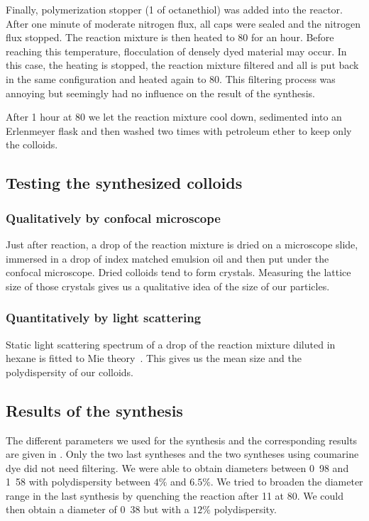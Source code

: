 Finally, polymerization stopper (\unit{1}{\milli\litre} of octanethiol) was added into the reactor. After one minute of moderate nitrogen flux, all caps were sealed and the nitrogen flux stopped. The reaction mixture is then heated to \unit{80}{\celsius} for an hour. Before reaching this temperature, flocculation of densely dyed material may occur. In this case, the heating is stopped, the reaction mixture filtered and all is put back in the same configuration and heated again to \unit{80}{\celsius}. This filtering process was annoying but seemingly had no influence on the result of the synthesis.

After 1 hour at \unit{80}{\celsius} we let the reaction mixture cool down, sedimented into an Erlenmeyer flask and then washed two times with petroleum ether to keep only the colloids.


\subsection{Testing the synthesized colloids}


\subsubsection{Qualitatively by confocal microscope}

Just after reaction, a drop of the reaction mixture is dried on a microscope slide, immersed in a drop of index matched emulsion oil and then put under the confocal microscope. Dried colloids tend to form crystals. Measuring the lattice size of those crystals gives us a qualitative idea of the size of our particles.


\subsubsection{Quantitatively by light scattering}

Static light scattering spectrum of a drop of the reaction mixture diluted in hexane is fitted to Mie theory~\citep{Bohren1983, Dhont1996}. This gives us the mean size and the polydispersity of our colloids.


\subsection{Results of the synthesis}

The different parameters we used for the synthesis and the corresponding results are given in . Only the two last syntheses and the two syntheses using coumarine dye did not need filtering. We were able to obtain diameters between \unit{0.98}{\micro\meter} and \unit{1.58}{\micro\meter} with polydispersity between $4\%$ and $6.5\%$. We tried to broaden the diameter range in the last synthesis by quenching the reaction after \unit{11}{\minute} at \unit{80}{\celsius}. We could then obtain a diameter of \unit{0.38}{\micro\meter} but with a $12\%$ polydispersity.


